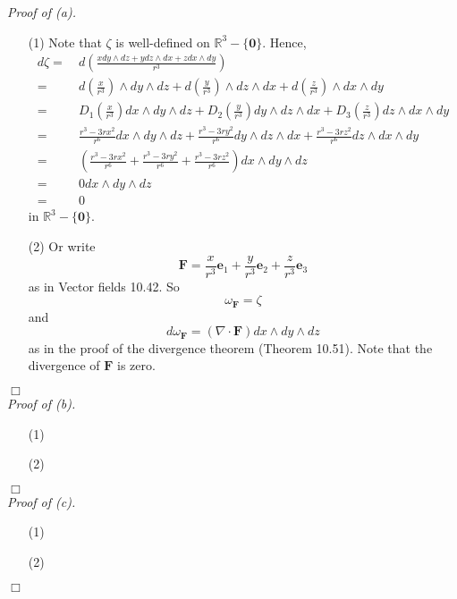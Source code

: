 \documentclass{article}
\begin{document}
\emph{Proof of (a).}
\begin{enumerate}
\item[(1)]
  Note that $\zeta$ is well-defined on $\mathbb{R}^3 - \{ \mathbf{0} \}$.
  Hence,
  \begin{align*}
    d\zeta
    =& \: d\left( \frac{x dy \wedge dz + y dz \wedge dx + z dx \wedge dy}{r^3} \right) \\
    =& \: d\left(\frac{x}{r^3}\right) \wedge dy \wedge dz
      + d\left(\frac{y}{r^3}\right) \wedge dz \wedge dx
      + d\left(\frac{z}{r^3}\right) \wedge dx \wedge dy \\
    =& \: D_1\left(\frac{x}{r^3}\right) dx \wedge dy \wedge dz
      + D_2\left(\frac{y}{r^3}\right) dy \wedge dz \wedge dx
      + D_3\left(\frac{z}{r^3}\right) dz \wedge dx \wedge dy \\
    =& \: \frac{r^3 - 3rx^2}{r^6} dx \wedge dy \wedge dz
      + \frac{r^3 - 3ry^2}{r^6} dy \wedge dz \wedge dx
      + \frac{r^3 - 3rz^2}{r^6} dz \wedge dx \wedge dy \\
    =& \: \left(\frac{r^3 - 3rx^2}{r^6}
      + \frac{r^3 - 3ry^2}{r^6}
      + \frac{r^3 - 3rz^2}{r^6}\right) dx \wedge dy \wedge dz \\
    =& \: 0 dx \wedge dy \wedge dz \\
    =& \: 0
  \end{align*}
  in $\mathbb{R}^3 - \{ \mathbf{0} \}$.

\item[(2)]
  Or write
  \[
    \mathbf{F}
    = \frac{x}{r^3} \mathbf{e}_1 + \frac{y}{r^3} \mathbf{e}_2 + \frac{z}{r^3}  \mathbf{e}_3
  \]
  as in Vector fields 10.42.
  So
  \[
    \omega_{\mathbf{F}} = \zeta
  \]
  and
  \[
    d\omega_{\mathbf{F}}
    = (\nabla \cdot \mathbf{F}) dx \wedge dy \wedge dz
  \]
  as in the proof of the divergence theorem (Theorem 10.51).
  Note that the divergence of $\mathbf{F}$ is zero.
\end{enumerate}
$\Box$ \\



\emph{Proof of (b).}
\begin{enumerate}
\item[(1)]
\item[(2)]

\end{enumerate}
$\Box$ \\



\emph{Proof of (c).}
\begin{enumerate}
\item[(1)]
\item[(2)]

\end{enumerate}
$\Box$ \\
\end{document}
